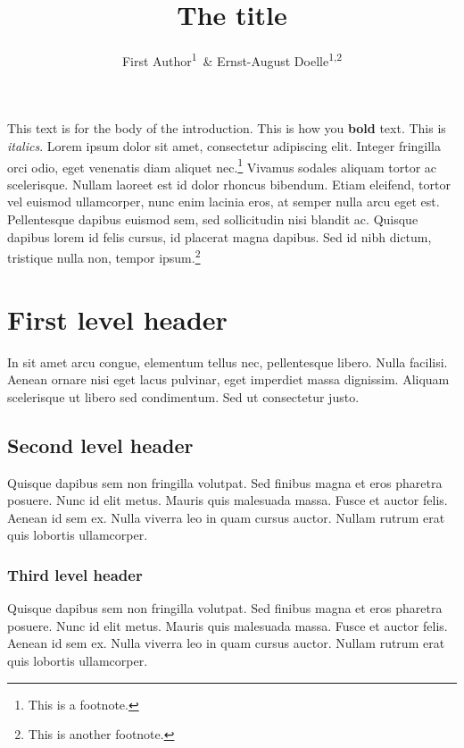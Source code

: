 \documentclass[
  man]{apa6}
\affiliation{
\vspace{0.5cm}
\textsuperscript{1} Wilhelm-Wundt-University\\\textsuperscript{2} Konstanz Business School}
\title{The title}
\author{First Author\textsuperscript{1}~\& Ernst-August Doelle\textsuperscript{1,2}}
\date{}
\begin{document}
\maketitle

This text is for the body of the introduction. This is how you \textbf{bold} text. This is \emph{italics}. Lorem ipsum dolor sit amet, consectetur adipiscing elit. Integer fringilla orci odio, eget venenatis diam aliquet nec.\footnote{This is a footnote.} Vivamus sodales aliquam tortor ac scelerisque. Nullam laoreet est id dolor rhoncus bibendum. Etiam eleifend, tortor vel euismod ullamcorper, nunc enim lacinia eros, at semper nulla arcu eget est. Pellentesque dapibus euismod sem, sed sollicitudin nisi blandit ac. Quisque dapibus lorem id felis cursus, id placerat magna dapibus. Sed id nibh dictum, tristique nulla non, tempor ipsum.\footnote{This is another footnote.}

\hypertarget{first-level-header}{%
\section{First level header}\label{first-level-header}}

In sit amet arcu congue, elementum tellus nec, pellentesque libero. Nulla facilisi. Aenean ornare nisi eget lacus pulvinar, eget imperdiet massa dignissim. Aliquam scelerisque ut libero sed condimentum. Sed ut consectetur justo.

\hypertarget{second-level-header}{%
\subsection{Second level header}\label{second-level-header}}

Quisque dapibus sem non fringilla volutpat. Sed finibus magna et eros pharetra posuere. Nunc id elit metus. Mauris quis malesuada massa. Fusce et auctor felis. Aenean id sem ex. Nulla viverra leo in quam cursus auctor. Nullam rutrum erat quis lobortis ullamcorper.

\hypertarget{third-level-header}{%
\subsubsection{Third level header}\label{third-level-header}}

Quisque dapibus sem non fringilla volutpat. Sed finibus magna et eros pharetra posuere. Nunc id elit metus. Mauris quis malesuada massa. Fusce et auctor felis. Aenean id sem ex. Nulla viverra leo in quam cursus auctor. Nullam rutrum erat quis lobortis ullamcorper.
\end{document}
